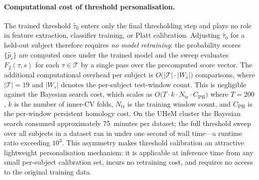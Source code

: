 \documentclass[onluarkali,ingilizce,yukseklisans,karton,LisansustuEgitim]{itutez}
\providecommand{\1}{\mathbf{1}}
\begin{document}
\paragraph{Computational cost of threshold personalisation.}
The trained threshold $\hat\tau_0$ enters only the final thresholding step
and plays no role in feature extraction, classifier training, or Platt calibration.
Adjusting $\hat\tau_0$ for a held-out subject therefore requires \emph{no model retraining}:
the probability scores $\{\hat{p}_i\}$ are computed once under the trained model and
the sweep evaluates $F_2(\tau,s)$ for each $\tau\in\mathcal{T}$ by a single pass over
the precomputed score vector.  The additional computational overhead per subject is
$O\bigl(|\mathcal{T}|\cdot|W_s|\bigr)$ comparisons, where $|\mathcal{T}|=19$ and
$|W_s|$ denotes the per-subject test-window count.  This is negligible against the
Bayesian search cost, which scales as
$O\bigl(T\cdot k\cdot N_{\mathrm{tr}}\cdot C_{\mathrm{PH}}\bigr)$
where $T=200$, $k$ is the number of inner-CV folds, $N_{\mathrm{tr}}$ is the training
window count, and $C_{\mathrm{PH}}$ is the per-window persistent homology cost.
On the UHeM cluster the Bayesian search consumed approximately 75~minutes per dataset;
the full threshold sweep over all subjects in a dataset ran in under one second of wall
time---a runtime ratio exceeding $10^3$.  This asymmetry makes threshold calibration an
attractive lightweight personalisation mechanism: it is applicable at inference time
from any small per-subject calibration set, incurs no retraining cost, and requires no
access to the original training data.
\end{document}
